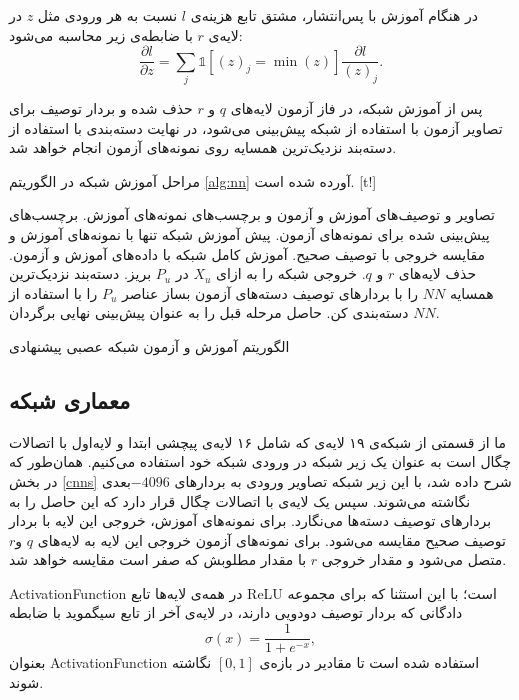 در هنگام آموزش با پس‌انتشار، مشتق تابع هزینه‌ی $l$ نسبت به هر ورودی مثل $z$ در لایه‌ی $r$ با ضابطه‌ی زیر محاسبه می‌شود:
\begin{equation}
\label{eq:grad_min}
\frac{\partial l}{\partial z} = \sum_j \mathds{1}[(z)_j=\min(z)]  \frac{\partial l}{(z)_j}.
\end{equation}

پس از آموزش شبکه، در فاز آزمون لایه‌های $q$ و $r$ حذف شده و بردار توصیف برای تصاویر آزمون با استفاده از شبکه پیش‌بینی می‌شود، در نهایت دسته‌بندی با استفاده از دسته‌بند نزدیک‌ترین همسایه روی نمونه‌های آزمون انجام خواهد شد.

مراحل آموزش شبکه در الگوریتم \ref{alg:nn} آورده شده است.
[t!]
	\begin{enumerate}[label={\arabic*},itemsep=.1em, parsep=.1em]
 تصاویر و توصیف‌های آموزش و آزمون و برچسب‌های نمونه‌های آموزش.
 برچسب‌های پیش‌بینی شده برای نمونه‌های آزمون.
 پیش آموزش شبکه تنها با نمونه‌های آموزش و مقایسه خروجی با توصیف صحیح.
 آموزش کامل شبکه با داده‌های آموزش و آزمون.
 حذف لایه‌های $r$ و $q$.
 خروجی شبکه را به ازای $X_u$ در $P_u$ بریز.
 دسته‌بند نزدیک‌ترین همسایه $NN$ را با بردارهای توصیف دسته‌های آزمون بساز
 عناصر $P_u$ را با استفاده از $NN$ دسته‌بندی کن.
 حاصل مرحله قبل را به عنوان پیش‌بینی نهایی برگردان.
\end{enumerate}
\caption{الگوریتم آموزش و آزمون شبکه عصبی پیشنهادی}
\label{alg:nn}
\subsection{معماری شبکه}\label{net_architechture}
ما از قسمتی از شبکه‌ی ۱۹ لایه‌ی  \cite{vgg} که شامل ۱۶ لایه‌ی پیچشی ابتدا و لایه‌‌‌اول با اتصالات چگال است به عنوان یک زیر شبکه در ورودی شبکه خود استفاده می‌کنیم. همان‌طور که در بخش
\ref{cnns}
شرح داده شد،
 با این زیر شبکه تصاویر ورودی به بردارهای $-4096$بعدی نگاشته می‌شوند.
  سپس یک لایه‌ی با اتصالات چگال قرار دارد که این حاصل را به بردارهای توصیف دسته‌ها می‌نگارد. برای نمونه‌های آموزش، خروجی این لایه با بردار توصیف صحیح مقایسه می‌شود. برای نمونه‌های آزمون خروجی این لایه به  لایه‌های  $q$ و$r$ متصل می‌شود و مقدار خروجی $r$ با مقدار مطلوبش که صفر است مقایسه خواهد شد.

\gls{ActivationFunction} در همه‌ی لایه‌ها تابع \gls{ReLU} است؛ با این استثنا که برای مجموعه‌ دادگانی که بردار توصیف دودویی دارند، در لایه‌ی آخر از تابع سیگموید با ضابطه
\begin{equation}
\sigma(x) = \frac{1}{1 + e^{-x}},
\end{equation}
بعنوان \gls{ActivationFunction} استفاده شده است تا مقادیر در بازه‌ی $[0,1]$ نگاشته شوند.


